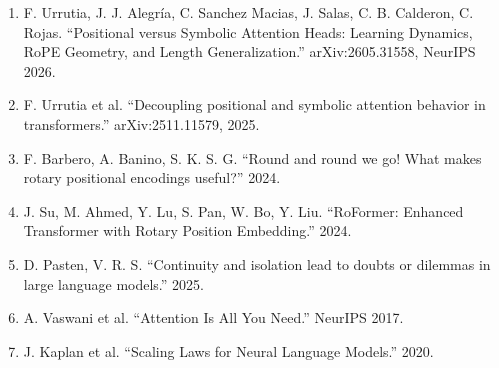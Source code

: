 \documentclass[12pt,a4paper,oneside]{report}
\begin{document}
\begin{enumerate}
    \item F. Urrutia, J. J. Alegría, C. Sanchez Macias, J. Salas, C. B. Calderon, C. Rojas. ``Positional versus Symbolic Attention Heads: Learning Dynamics, RoPE Geometry, and Length Generalization.'' arXiv:2605.31558, NeurIPS 2026.
    \item F. Urrutia et al. ``Decoupling positional and symbolic attention behavior in transformers.'' arXiv:2511.11579, 2025.
    \item F. Barbero, A. Banino, S. K. S. G. ``Round and round we go! What makes rotary positional encodings useful?'' 2024.
    \item J. Su, M. Ahmed, Y. Lu, S. Pan, W. Bo, Y. Liu. ``RoFormer: Enhanced Transformer with Rotary Position Embedding.'' 2024.
    \item D. Pasten, V. R. S. ``Continuity and isolation lead to doubts or dilemmas in large language models.'' 2025.
    \item A. Vaswani et al. ``Attention Is All You Need.'' NeurIPS 2017.
    \item J. Kaplan et al. ``Scaling Laws for Neural Language Models.'' 2020.
\end{enumerate}
\end{document}

